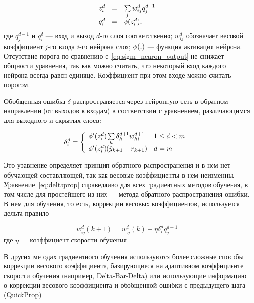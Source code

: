 \begin{equation}
\label{eq:sigm_neuron_output_parts}
\begin{array}{rcl}
  z^d_i & = & \sum\limits_j w^d_{ij}q^{d-1}_j \\
  q^d_i & = & \fa(z^d_i),
\end{array}
\end{equation} где $q^{d-1}_j$ и $q^d_i$ --- вход и выход $d$-го слоя
соответственно; $w^d_{ij}$ обозначает весовой коэффициент $j$-го входа
$i$-го нейрона слоя; $\phi(.)$ --- функция активации нейрона.
Отсутствие порога по сравнению с~\eqref{eq:sigm_neuron_output} не
снижает общности уравнения, так как можно считать, что некоторый вход
каждого нейрона всегда равен единице.  Коэффициент при этом входе
можно считать порогом.

Обобщенная ошибка $\delta$ распространяется через нейронную сеть в
обратном направлении (от выходов к входам) в соответствии с
уравнением, различающимся для выходного и скрытых слоев:

\begin{equation}
\label{eq:deltaprop}
  \delta^d_i=\left\{\begin{array}{ll}
    \fa'(z^d_i)\sum\limits_h\delta^{d+1}_h w^{d+1}_{hi} & 1\le d<m \\
    \fa'(z^d_i)(\hat{y}_{k+1}-r_{k+1}) & d=m \\
  \end{array}\right.
\end{equation}

Это уравнение определяет принцип обратного распространения и в нем нет
обучающей составляющей, так как весовые коэффициенты в нем неизменны.
Уравнение~\eqref{eq:deltaprop} справедливо для всех градиентных
методов обучения, в том числе для простейшего из них --- метода
обратного распространения ошибки.  В нем для обучения, то есть,
коррекции весовых коэффициентов, используется дельта-правило

\begin{equation}
\label{eq:weightchange}
  w^d_{ij}(k+1)=w^d_{ij}(k)-\eta\delta^d_i q^{d-1}_j
\end{equation} где $\eta$ --- коэффициент скорости обучения.

В других методах градиентного обучения используются более сложные
способы коррекции весового коэффициента, базирующиеся на адаптивном
коэффициенте скорости обучения (например, Delta-Bar-Delta) или
использующие информацию о коррекции весового коэффициента и обобщенной
ошибки с предыдущего шага (QuickProp).

